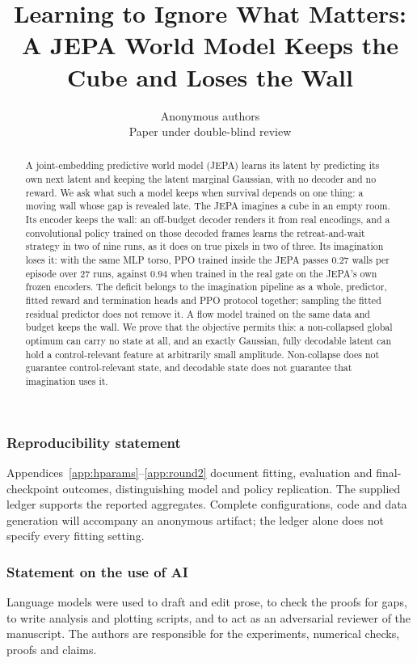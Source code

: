 \documentclass{article}
\title{Learning to Ignore What Matters:\\ A JEPA World Model Keeps the Cube and Loses the Wall}
\author{Anonymous authors\\Paper under double-blind review}
\theoremstyle{remark}
\begin{document}
\maketitle


\begin{abstract}
A joint-embedding predictive world model (JEPA) learns its latent by predicting its own next latent and
keeping the latent marginal Gaussian, with no decoder and no reward. We ask what such a model keeps when
survival depends on one thing: a moving wall whose gap is revealed late. The JEPA imagines a cube in an
empty room. Its encoder keeps the wall: an off-budget decoder renders it from real encodings, and a
convolutional policy trained on those decoded frames learns the retreat-and-wait strategy in two of nine
runs, as it does on true pixels in two of three. Its imagination loses it: with the same MLP torso, PPO
trained inside the JEPA passes $0.27$ walls per episode over $27$ runs, against $0.94$ when trained in the
real gate on the JEPA's own frozen encoders. The deficit belongs to the imagination pipeline as a whole,
predictor, fitted reward and termination heads and PPO protocol together; sampling the fitted residual
predictor does not remove it. A flow model trained on the same data and budget keeps the wall. We prove
that the objective permits this: a non-collapsed global optimum can carry no state at all, and an exactly
Gaussian, fully decodable latent can hold a control-relevant feature at arbitrarily small amplitude.
Non-collapse does not guarantee control-relevant state, and decodable state does not guarantee that
imagination uses it.
\end{abstract}







\clearpage


\subsubsection*{Reproducibility statement}
Appendices~\ref{app:hparams}--\ref{app:round2} document fitting, evaluation and final-checkpoint
outcomes, distinguishing model and policy replication. The supplied ledger supports the reported
aggregates. Complete configurations, code and data generation will accompany an anonymous artifact;
the ledger alone does not specify every fitting setting.

\subsubsection*{Statement on the use of AI}
Language models were used to draft and edit prose, to check the proofs for gaps, to write analysis and plotting
scripts, and to act as an adversarial reviewer of the manuscript. The authors are responsible for the experiments, numerical checks, proofs and claims.

\clearpage



\appendix

\end{document}
